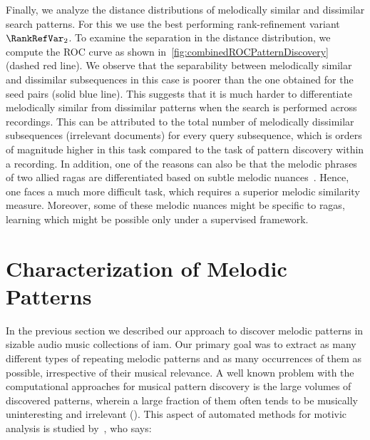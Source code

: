 Finally, we analyze the distance distributions of melodically similar and dissimilar search patterns. For this we use the best performing rank-refinement variant $\RankRefVar_2$. To examine the separation in the distance distribution, we compute the ROC curve as shown in~\ref{fig:combinedROCPatternDiscovery} (dashed red line). We observe that the separability between melodically similar and dissimilar subsequences in this case is poorer than the one obtained for the seed pairs (solid blue line). This suggests that it is much harder to differentiate melodically similar from dissimilar patterns when the search is performed across recordings. This can be attributed to the total number of melodically dissimilar subsequences (irrelevant documents) for every query subsequence, which is orders of magnitude higher in this task compared to the task of pattern discovery within a recording. In addition, one of the reasons can also be that the melodic phrases of two allied \glspl{raga}  are differentiated based on subtle melodic nuances~\cite{Viswanathan2004}. Hence, one faces a much more difficult task, which requires a superior melodic similarity measure. Moreover, some of these melodic nuances might be specific to \glspl{raga}, learning which might be possible only under a supervised framework. 





\section{Characterization of Melodic Patterns}
\label{sec:patterns_characterization_of_melodic_patterns}

In the previous section we described our approach to discover melodic patterns in sizable audio music collections of \gls{iam}. Our primary goal was to extract as many different types of repeating melodic patterns and as many occurrences of them as possible, irrespective of their musical relevance. A well known problem with the computational approaches for musical pattern discovery is the large volumes of discovered patterns, wherein a large fraction of them often tends to be musically uninteresting and irrelevant (). This aspect of automated methods for motivic analysis is studied by~\cite{marsden2012counselling}, who says:

